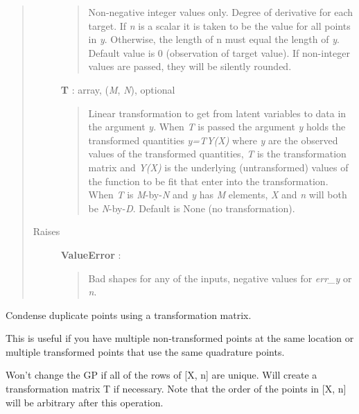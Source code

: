 \documentclass[letterpaper,10pt,english]{sphinxmanual}
\begin{document}
\begin{fulllineitems}
\begin{fulllineitems}
\begin{quote}
\begin{description}
\begin{quote}
Non-negative integer values only. Degree of derivative for each
target. If \emph{n} is a scalar it is taken to be the value for all
points in \emph{y}. Otherwise, the length of n must equal the length of
\emph{y}. Default value is 0 (observation of target value). If
non-integer values are passed, they will be silently rounded.
\end{quote}

\textbf{T} : array, (\emph{M}, \emph{N}), optional
\begin{quote}

Linear transformation to get from latent variables to data in the
argument \emph{y}. When \emph{T} is passed the argument \emph{y} holds the
transformed quantities \emph{y=TY(X)} where \emph{y} are the observed values
of the transformed quantities, \emph{T} is the transformation matrix and
\emph{Y(X)} is the underlying (untransformed) values of the function to
be fit that enter into the transformation. When \emph{T} is \emph{M}-by-\emph{N}
and \emph{y} has \emph{M} elements, \emph{X} and \emph{n} will both be \emph{N}-by-\emph{D}.
Default is None (no transformation).
\end{quote}

\item[{Raises}] \leavevmode
\textbf{ValueError} :
\begin{quote}

Bad shapes for any of the inputs, negative values for \emph{err\_y} or \emph{n}.
\end{quote}

\end{description}\end{quote}

\end{fulllineitems}


\begin{fulllineitems}
\label{gptools:gptools.gaussian_process.GaussianProcess.condense_duplicates}
Condense duplicate points using a transformation matrix.

This is useful if you have multiple non-transformed points at the same
location or multiple transformed points that use the same quadrature
points.

Won't change the GP if all of the rows of {[}X, n{]} are unique. Will create
a transformation matrix T if necessary. Note that the order of the
points in {[}X, n{]} will be arbitrary after this operation.


\end{fulllineitems}
\end{fulllineitems}
\end{document}
